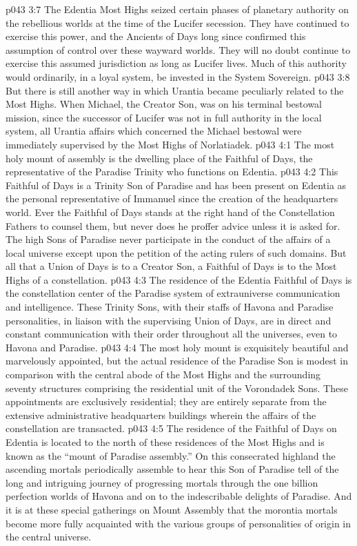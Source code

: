 \vs p043 3:7 The Edentia Most Highs seized certain phases of planetary authority on the rebellious worlds at the time of the Lucifer secession. They have continued to exercise this power, and the Ancients of Days long since confirmed this assumption of control over these wayward worlds. They will no doubt continue to exercise this assumed jurisdiction as long as Lucifer lives. Much of this authority would ordinarily, in a loyal system, be invested in the System Sovereign.
\vs p043 3:8 But there is still another way in which Urantia became peculiarly related to the Most Highs. When Michael, the Creator Son, was on his terminal bestowal mission, since the successor of Lucifer was not in full authority in the local system, all Urantia affairs which concerned the Michael bestowal were immediately supervised by the Most Highs of Norlatiadek.
\vs p043 4:1 The most holy mount of assembly is the dwelling place of the Faithful of Days, the representative of the Paradise Trinity who functions on Edentia.
\vs p043 4:2 This Faithful of Days is a Trinity Son of Paradise and has been present on Edentia as the personal representative of Immanuel since the creation of the headquarters world. Ever the Faithful of Days stands at the right hand of the Constellation Fathers to counsel them, but never does he proffer advice unless it is asked for. The high Sons of Paradise never participate in the conduct of the affairs of a local universe except upon the petition of the acting rulers of such domains. But all that a Union of Days is to a Creator Son, a Faithful of Days is to the Most Highs of a constellation.
\vs p043 4:3 The residence of the Edentia Faithful of Days is the constellation center of the Paradise system of extrauniverse communication and intelligence. These Trinity Sons, with their staffs of Havona and Paradise personalities, in liaison with the supervising Union of Days, are in direct and constant communication with their order throughout all the universes, even to Havona and Paradise.
\vs p043 4:4 The most holy mount is exquisitely beautiful and marvelously appointed, but the actual residence of the Paradise Son is modest in comparison with the central abode of the Most Highs and the surrounding seventy structures comprising the residential unit of the Vorondadek Sons. These appointments are exclusively residential; they are entirely separate from the extensive administrative headquarters buildings wherein the affairs of the constellation are transacted.
\vs p043 4:5 The residence of the Faithful of Days on Edentia is located to the north of these residences of the Most Highs and is known as the “mount of Paradise assembly.” On this consecrated highland the ascending mortals periodically assemble to hear this Son of Paradise tell of the long and intriguing journey of progressing mortals through the one billion perfection worlds of Havona and on to the indescribable delights of Paradise. And it is at these special gatherings on Mount Assembly that the morontia mortals become more fully acquainted with the various groups of personalities of origin in the central universe.
